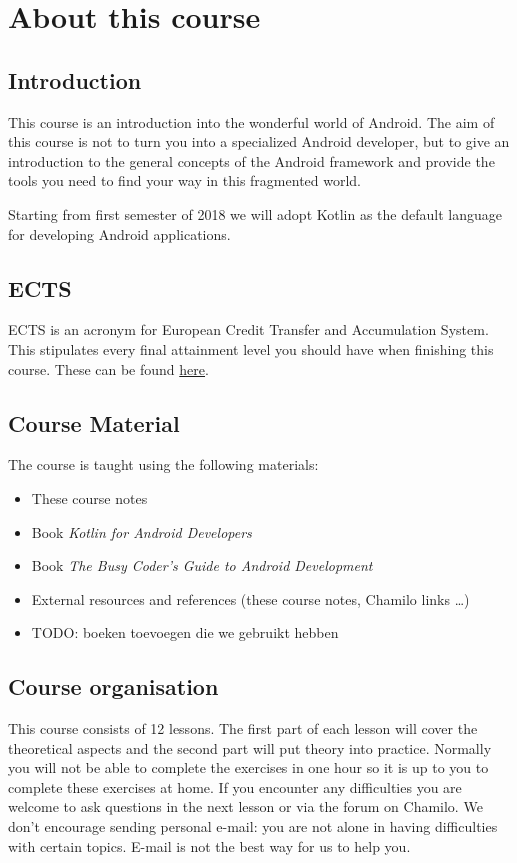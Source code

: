 \chapter{About this course}

\section{Introduction}
This course is an introduction into the wonderful world of Android.
The aim of this course is not to turn you into a specialized Android developer, but to give an introduction to the general concepts of the Android framework and provide the tools you need to find your way in this fragmented world. 

Starting from first semester of 2018 we will adopt Kotlin as the default language for developing Android applications. 

\section{ECTS}
ECTS is an acronym for European Credit Transfer and Accumulation System.
This stipulates every final attainment level you should have when finishing this course.
These can be found \href{https://bamaflexweb.hogent.be/BMFUIDetailxOLOD.aspx?a=98522\&b=5\&c=1}{here}. 

\section{Course Material}
The course is taught using the following materials:

\begin{itemize}
	\item These course notes
	\item Book \textit{Kotlin for Android Developers} \cite{Leiva2018}
	\item Book  \textit{The Busy Coder's Guide to Android Development} \cite{murphymarkl.2017}
	\item External resources and references (these course notes, Chamilo links \dots)
	\item TODO: boeken toevoegen die we gebruikt hebben
\end{itemize}

\section{Course organisation}
This course consists of 12 lessons.
The first part of each lesson will cover the theoretical aspects and the second part will put theory into practice.
Normally you will not be able to complete the exercises in one hour so it is up to you to complete these exercises at home.
If you encounter any difficulties  you are welcome to ask questions in the next lesson or via the forum on Chamilo.
We don't encourage sending personal e-mail: you are not alone in having difficulties with certain topics.
E-mail is not the best way for us to help you.

